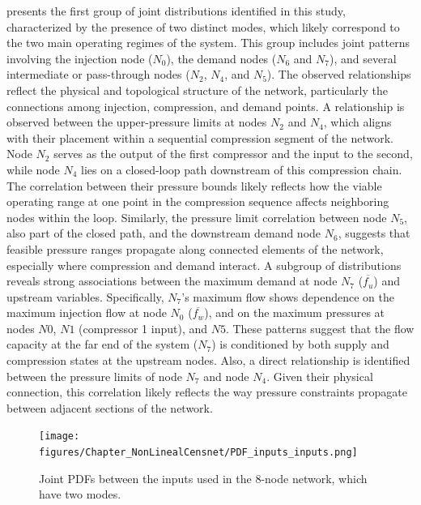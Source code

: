  presents the first group of joint distributions identified in this study, characterized by the presence of two distinct modes, which likely correspond to the two main operating regimes of the system. This group includes joint patterns involving the injection node ($N_0$), the demand nodes ($N_6$ and $N_7$), and several intermediate or pass-through nodes ($N_2$, $N_4$, and $N_5$). The observed relationships reflect the physical and topological structure of the network, particularly the connections among injection, compression, and demand points. A relationship is observed between the upper-pressure limits at nodes \( N_2 \) and \( N_4 \), which aligns with their placement within a sequential compression segment of the network. Node \( N_2 \) serves as the output of the first compressor and the input to the second, while node \( N_4 \) lies on a closed-loop path downstream of this compression chain. The correlation between their pressure bounds likely reflects how the viable operating range at one point in the compression sequence affects neighboring nodes within the loop. Similarly, the pressure limit correlation between node \( N_5 \), also part of the closed path, and the downstream demand node \( N_6 \), suggests that feasible pressure ranges propagate along connected elements of the network, especially where compression and demand interact. A subgroup of distributions reveals strong associations between the maximum demand at node $N_7$ ($\overline{f_u}$) and upstream variables. Specifically, $N_7$'s maximum flow shows dependence on the maximum injection flow at node $N_0$ ($\overline{f_w}$), and on the maximum pressures at nodes $N0$, $N1$ (compressor 1 input), and $N5$. These patterns suggest that the flow capacity at the far end of the system ($N_7$) is conditioned by both supply and compression states at the upstream nodes. Also, a direct relationship is identified between the pressure limits of node $N_7$ and node $N_4$. Given their physical connection, this correlation likely reflects the way pressure constraints propagate between adjacent sections of the network.

\begin{figure}[h]
    \begin{center}
        \texttt{[image: figures/Chapter\_NonLinealCensnet/PDF\_inputs\_inputs.png]}
    \end{center}
    \caption{Joint PDFs between the inputs used in the 8-node network, which have two modes. }\label{fig:joint_distributions_input_input}
\end{figure}



